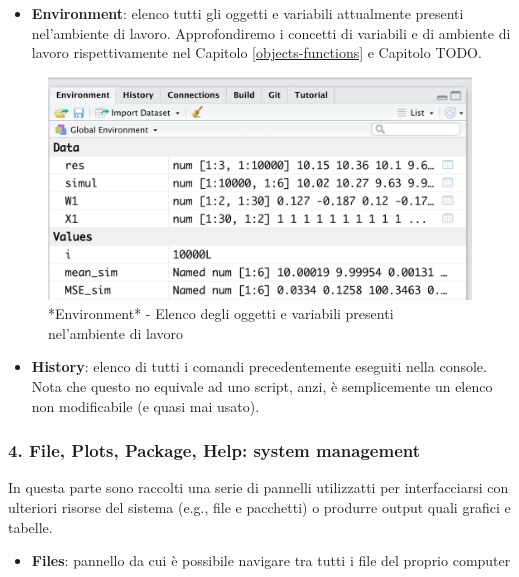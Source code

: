 \documentclass[
]{book}
\providecommand{\tightlist}{%
  \setlength{\itemsep}{0pt}\setlength{\parskip}{0pt}}
\begin{document}
\begin{itemize}
\tightlist
\item
  \textbf{Environment}: elenco tutti gli oggetti e variabili attualmente presenti nel'ambiente di lavoro. Approfondiremo i concetti di variabili e di ambiente di lavoro rispettivamente nel Capitolo \ref{objects-functions} e Capitolo TODO.
\end{itemize}

\begin{figure}

{\centering \includegraphics[width=0.6\linewidth]{images/environment} 

}

\caption{*Environment* - Elenco degli oggetti e variabili presenti nel'ambiente di lavoro}\label{fig:environment}
\end{figure}

\begin{itemize}
\tightlist
\item
  \textbf{History}: elenco di tutti i comandi precedentemente eseguiti nella console. Nota che questo no equivale ad uno script, anzi, è semplicemente un elenco non modificabile (e quasi mai usato).
\end{itemize}

\hypertarget{file-plots-package-help-system-management}{%
\subsubsection*{4. File, Plots, Package, Help: system management}\label{file-plots-package-help-system-management}}

In questa parte sono raccolti una serie di pannelli utilizzatti per interfacciarsi con ulteriori risorse del sistema (e.g., file e pacchetti) o produrre output quali grafici e tabelle.

\begin{itemize}
\tightlist
\item
  \textbf{Files}: pannello da cui è possibile navigare tra tutti i file del proprio computer
\end{itemize}
\end{document}
